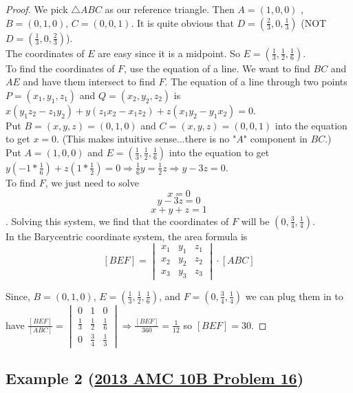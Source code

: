 \documentclass[11pt]{scrartcl}
\begin{document}
\begin{proof}
    We pick $\bigtriangleup ABC$ as our reference triangle. Then $A=(1,0,0)$ , $B=(0,1,0)$, $C=(0,0,1)$. It is quite obvious that $D=(\frac 23 ,0,\frac 13)$ (NOT $D=(\frac 13 ,0,\frac 23)$).\\

The coordinates of $E$ are easy since it is a midpoint. So $E=(\frac 13,\frac 12,\frac 16)$.\\

To find the coordinates of $F$, use the equation of a line. We want to find $BC$ and $AE$ and have them intersect to find $F$.  The equation of a line through two points $P=(x_1,y_1,z_1)$ and $Q=(x_2,y_2,z_2)$ is $x(y_1z_2 -z_1y_2)+y(z_1x_2-x_1z_2)+z(x_1y_2-y_1x_2)=0$. \\

Put $B=(x,y,z) = (0,1,0)$ and $C=(x,y,z) = (0,0,1)$ into the equation to get $x = 0$. (This makes intuitive sense...there is no "$A$" component in $BC$.)\\

Put $A=(1,0,0)$ and $E=(\frac 13,\frac 12,\frac 16)$ into the equation to get $y(-1*\frac 16)+z(1*\frac 12)=0 \Rightarrow \frac 16y=\frac 12z\Rightarrow y-3z=0$. \\

To find $F$, we just need to solve $$x=0$$ $$y-3z=0$$ $$x+y+z=1$$. Solving this system, we find that the coordinates of $F$ will be $\left(0, \frac{3}{4}, \frac{1}{4} \right)$.\\

In the Barycentric coordinate system, the area formula is $$[BEF]=\begin{vmatrix}
x_{1} &y_{1}  &z_{1} \\ 
x_{2} &y_{2}  &z_{2} \\ 
 x_{3}& y_{3} & z_{3}
\end{vmatrix}\cdot [ABC]$$

Since, $B=(0,1,0)$, $E=(\frac 13,\frac 12,\frac 16)$, and $F=\left(0, \frac{3}{4}, \frac{1}{4} \right)$ we can plug them in to have $\frac{[BEF]}{[ABC]}=\begin{vmatrix}
0&1 &0 \\ 
\frac{1}{3} &\frac{1}{2} &\frac{1}{6} \\ 
0&\frac{3}{4}&  \frac{1}{3} 
\end{vmatrix}\Rightarrow \frac{[BEF]}{360}=\frac{1}{12}$ so $[BEF]=30$. 
\end{proof}

\subsection{Example 2 (\href{https://artofproblemsolving.com/community/c5h521757}{2013 AMC 10B Problem 16})}
\end{document}

